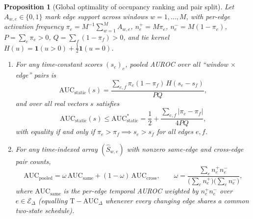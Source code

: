 \documentclass[11pt]{article}
\newtheorem{proposition}{Proposition}
\begin{document}
\begin{proposition}[Global optimality of occupancy ranking and pair split]
\label{prop:supp-occupancy}
Let $A_{w,e}\in\{0,1\}$ mark edge support across windows $w=1,\dots,M$, with
per-edge activation frequency $\pi_e=M^{-1}\sum_{w=1}^M A_{w,e}$, $n_e^+=M\pi_e$,
$n_e^-=M(1-\pi_e)$, $P=\sum_e\pi_e>0$, $Q=\sum_f(1-\pi_f)>0$, and tie kernel
$H(u)=\mathbf1(u>0)+\tfrac12\mathbf1(u=0)$.
\begin{enumerate}
\item[(i)] For any time-constant scores $(s_e)_e$, pooled AUROC over all
``window $\times$ edge'' pairs is
\begin{equation}
\mathrm{AUC}_{\mathrm{static}}(s)
=
\frac{\sum_{e,f}\pi_e(1-\pi_f)\,H(s_e-s_f)}
{PQ},
\label{eq:auc-static}
\end{equation}
and over all real vectors $s$ satisfies
\begin{equation}
\mathrm{AUC}_{\mathrm{static}}(s)
\le
\mathrm{AUC}_{\mathrm{static}}^{*}
=
\frac12+\frac{\sum_{e,f}|\pi_e-\pi_f|}{4PQ},
\label{eq:static-ceiling}
\end{equation}
with equality if and only if $\pi_e>\pi_f\implies s_e>s_f$ for all edges $e,f$.
\item[(ii)] For any time-indexed array $(\widehat S_{w,e})$ with nonzero
same-edge and cross-edge pair counts,
\begin{equation}
\mathrm{AUC}_{\mathrm{pooled}}
=
\omega\,\mathrm{AUC}_{\mathrm{same}}
+
(1-\omega)\,\mathrm{AUC}_{\mathrm{cross}},
\qquad
\omega=\frac{\sum_e n_e^+n_e^-}{\bigl(\sum_e n_e^+\bigr)\bigl(\sum_e n_e^-\bigr)},
\label{eq:pooled-split}
\end{equation}
where $\mathrm{AUC}_{\mathrm{same}}$ is the per-edge temporal AUROC weighted by
$n_e^+n_e^-$ over $e\in\mathcal E_\Delta$ (equalling $\mathrm{T\!-\!AUC}_\Delta$
whenever every changing edge shares a common two-state schedule).
\end{enumerate}
\end{proposition}
\end{document}
